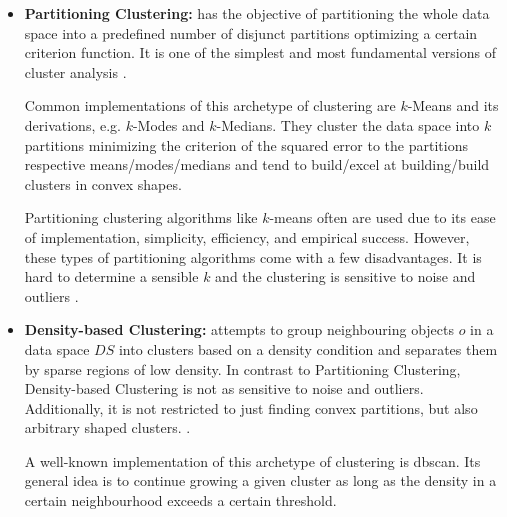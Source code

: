 \begin{itemize}
    \item \textbf{Partitioning Clustering:} has the objective of partitioning the whole data space into a predefined number of disjunct partitions optimizing a certain criterion function. It is one of the simplest and most fundamental versions of cluster analysis \cite[Ch.10.2]{han2011data}.
    
    Common implementations of this archetype of clustering are $k$-Means\cite{kmeansmacqueen1967some} and its derivations, e.g. $k$-Modes and $k$-Medians\cite{kmeanshalfcenturysteinley2006k}. They cluster the data space into $k$ partitions minimizing the criterion of the squared error to the partitions respective means/modes/medians and tend to build/excel at building/build clusters in convex shapes\cite{clusteringsurveyberkhin2006survey}. 
    
    Partitioning clustering algorithms like $k$-means often are used due to its ease of implementation, simplicity, efficiency, and empirical success\cite{kmeans50jain2010data}.
    However, these types of partitioning algorithms come with a few disadvantages. It is hard to determine a sensible $k$ and the clustering is sensitive to noise and outliers \cite{dataclusteringreviewjain1999data}. 
    
    \item \textbf{Density-based Clustering:} attempts to group neighbouring objects $o$ in a data space $DS$ into clusters based on a density condition and separates them by sparse regions of low density. In contrast to Partitioning Clustering, Density-based Clustering is not as sensitive to noise and outliers. Additionally, it is not restricted to just finding convex partitions, but also arbitrary shaped clusters. \cite[Ch.10.4]{han2011data}.
    
    A well-known implementation of this archetype of clustering is \acrshort{dbscan}\cite{DBSCANEKSX96}. Its general idea is to continue growing a given cluster as long as the density in a certain neighbourhood exceeds a certain threshold. 
    

\end{itemize}

